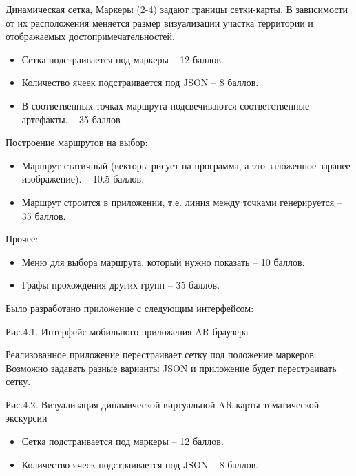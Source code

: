 \markSection

Динамическая сетка, Маркеры (2-4) задают границы сетки-карты. В зависимости от их расположения  меняется размер визуализации участка территории и отображаемых достопримечательностей.
\begin{itemize}
    \item Сетка подстраивается под маркеры – 12 баллов. 
    \item Количество ячеек подстраивается под JSON – 8 баллов.
    \item В соответвенных точках маршрута подсвечиваются соответственные артефакты. – 35 баллов
\end{itemize}

Построение маршрутов на выбор:
\begin{itemize} 
    \item	Маршрут статичный (векторы рисует на программа, а это заложенное заранее изображение). – 10.5 баллов.
    \item	Маршрут строится в приложении, т.е. линия между точками генерируется – 35 баллов.
\end{itemize}

Прочее:
\begin{itemize}
    \item	Меню для выбора маршрута, который нужно показать – 10 баллов.
    \item	Графы прохождения других групп – 35 баллов.
\end{itemize}

\solutionSection
Было разработано приложение с следующим интерфейсом:

\begin{center}
    Рис.4.1. Интерфейс мобильного приложения AR-браузера
\end{center}

Реализованное приложение перестраивает сетку под положение маркеров. Возможно задавать разные варианты JSON и приложение будет перестраивать сетку.

\begin{center}
    Рис.4.2. Визуализация динамической виртуальной AR-карты тематической экскурсии
\end{center}

\markSection

\begin{itemize}
    \item	Сетка подстраивается под маркеры – 12 баллов. 
    \item	Количество ячеек подстраивается под JSON – 8 баллов.
\end{itemize}


